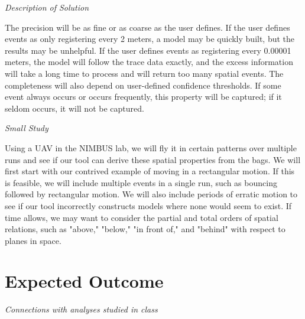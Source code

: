\documentclass{article}
\begin{document}
\emph{Description of Solution}

The precision will be as fine or as coarse as the user defines.
If the user defines events as only registering every 2 meters, a model may be quickly built, but the results may be unhelpful.
If the user defines events as registering every 0.00001 meters, the model will follow the trace data exactly, and the excess information will take a long time to process and will return too many spatial events.
The completeness will also depend on user-defined confidence thresholds.
If some event always occurs or occurs frequently, this property will be captured; if it seldom occurs, it will not be captured.  

\emph{Small Study}

Using a UAV in the NIMBUS lab, we will fly it in certain patterns over multiple runs and see if our tool can derive these spatial properties from the bags.
We will first start with our contrived example of moving in a rectangular motion.  
If this is feasible, we will include multiple events in a single run, such as bouncing followed by rectangular motion.
We will also include periods of erratic motion to see if our tool incorrectly constructs models where none would seem to exist.
If time allows, we may want to consider the partial and total orders of spatial relations, such as "above," "below," "in front of," and "behind" with respect to planes in space.



\section{Expected Outcome} 

\emph{Connections with analyses studied in class}
\end{document}

